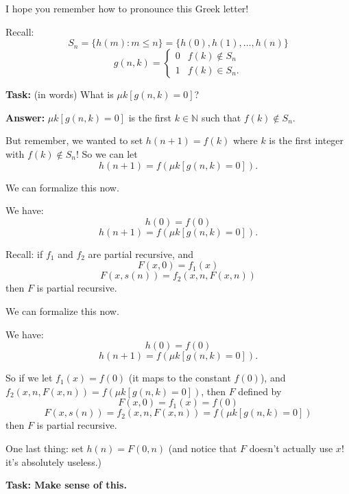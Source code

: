 \documentclass{beamer}
\begin{document}
\begin{frame}{I hope you remember how to pronounce this Greek letter!}

Recall: $$S_n = \{h(m): m \leq n\} = \{h(0), h(1), \ldots, h(n)\}$$ $$g(n, k) = \begin{cases}
0 & f(k) \notin S_n\\
1 & f(k) \in S_n.
\end{cases}$$

\textbf{Task:} (in words) What is $\mu k[g(n, k) = 0]$?

\textbf{Answer:} $\mu k[g(n, k) = 0]$ is the first $k \in \mathbb N$ such that $f(k) \notin S_n$. 

\vspace{4mm}

But remember, we wanted to set $h(n + 1) = f(k)$ where $k$ is the first integer with $f(k) \notin S_n$! So we can let
$$h(n + 1) = f(\mu k[g(n, k) = 0]).$$

\end{frame}

\begin{frame}{We can formalize this now.}

We have:
$$h(0) = f(0)$$
$$h(n + 1) = f(\mu k[g(n, k) = 0]).$$

Recall: if $f_1$ and $f_2$ are partial recursive, and
$$F(x, 0) = f_1(x)$$
$$F(x, s(n)) = f_2(x, n, F(x, n))$$
then $F$ is partial recursive.
\end{frame}

\begin{frame}{We can formalize this now.}

We have:
$$h(0) = f(0)$$
$$h(n + 1) = f(\mu k[g(n, k) = 0]).$$

So if we let $f_1(x) = f(0)$ (it maps to the constant $f(0)$), and $f_2(x, n, F(x, n)) = f(\mu k[g(n, k) = 0])$, then $F$ defined by
$$F(x, 0) = f_1(x) = f(0)$$
$$F(x, s(n)) = f_2(x, n, F(x, n)) = f(\mu k[g(n, k) = 0])$$
then $F$ is partial recursive.

One last thing: set $h(n) = F(0, n)$ (and notice that $F$ doesn't actually use $x$! it's absolutely useless.)

\vspace{2mm}
\textbf{Task: Make sense of this.}
\end{frame}
\end{document}

